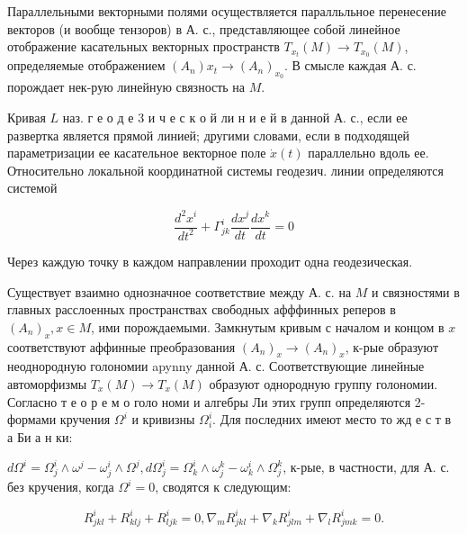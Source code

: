 \documentclass[10pt]{article}
\begin{document}
Параллельными векторными полями осуществляется паралльльное перенесение векторов (и вообще тензоров) в А. с., представляющее собой линейное отображение касательных векторных пространств $T_{x_{t}}(M) \rightarrow T_{x_{0}}(M)$, определяемые отображением $\left(A_{n}\right) x_{t} \rightarrow\left(A_{n}\right)_{x_{0}}$. В смысле каждая А. с. порождает нек-рую линейную связность на $M$.



Кривая $L$ наз. г е о д е 3 и ч е с к о й ли н и е й в данной А. с., если ее развертка является прямой линией; другими словами, если в подходящей параметризации ее касательное векторное поле $\dot{x}(t)$ параллельно вдоль ее. Относительно локальной координатной системы геодезич. линии определяются системой



\[

\frac{d^{2} x^{i}}{d t^{2}}+\Gamma_{j k}^{i} \frac{d x^{j}}{d t} \frac{d x^{k}}{d t}=0

\]



Через каждую точку в каждом направлении проходит одна геодезическая.



Существует взаимно однозначное соответствие между А. с. на $M$ и связностями в главных расслоенных пространствах свободных афффинных реперов в $\left(A_{n}\right)_{x}, x \in M$, ими порождаемыми. Замкнутым кривым с началом и концом в $x$ соответствуют аффинные преобразования $\left(A_{n}\right)_{x} \rightarrow\left(A_{n}\right)_{x}$, к-рые образуют неоднородную голономии apynny данной А. с. Соответствующие линейные автоморфизмы $T_{x}(M) \rightarrow T_{x}(M)$ образуют однородную группу голономии. Согласно т е о р е м о голо номи и алгебры Ли этих групп определяются 2-формами кручения $\Omega^{i}$ и кривизны $\Omega_{i}^{i}$. Для последних имеют место то жд е с т в а Би а н ки:



$d \Omega^{i}=\Omega_{j}^{i} \wedge \omega^{j}-\omega_{j}^{i} \wedge \Omega^{j}, d \Omega_{j}^{i}=\Omega_{k}^{i} \wedge \omega_{j}^{k}-\omega_{k}^{i} \wedge \Omega_{j}^{k}$, к-рые, в частности, для А. с. без кручения, когда $\Omega^{i}=0$, сводятся к следующим:



\[

R_{j k l}^{i}+R_{k l j}^{i}+R_{l j k}^{i}=0, \nabla_{m} R_{j k l}^{i}+\nabla_{k} R_{j l m}^{i}+\nabla_{l} R_{j m k}^{i}=0 .

\]
\end{document}
